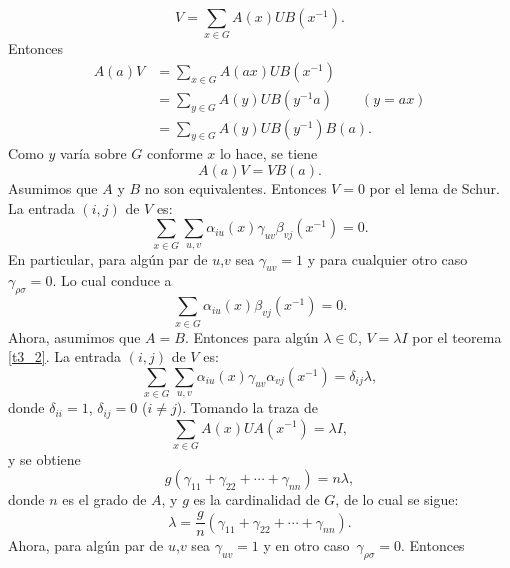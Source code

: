 \documentclass[12pt]{book}
\theoremstyle{definition}
\newcounter{in}
\begin{document}
\begin{equation}
  \label{eq:22}
  V=\sum_{x \in G} A(x)UB(x^{-1}).  
\end{equation}
Entonces
\begin{equation}
  \label{eq:23}
  \begin{aligned}
    A(a)V &=\sum_{x \in G} A(ax)UB(x^{-1})\\
    &=\sum_{y \in G} A(y)UB(y^{-1}a) \qquad (y=ax)\\
    &=\sum_{y \in G} A(y)UB(y^{-1})B(a).
  \end{aligned}
\end{equation}
Como $y$ varía sobre $G$ conforme $x$ lo hace, se tiene
\begin{equation}
  \label{eq:24}
  A(a)V=VB(a).
\end{equation} 
Asumimos que $A$ y $B$ no son equivalentes. Entonces $V=0$ por el lema
de Schur. La entrada $(i,j)$ de $V$ es:
\begin{equation}
  \label{eq:25}
  \sum_{x \in G} \sum_{u,v} \alpha_{iu}(x) \gamma_{uv} \beta_{vj}(x^{-1}) = 0.
\end{equation}
En particular, para algún par de $u$,$v$ sea $\gamma_{uv}=1$ y para
cualquier otro caso~$\gamma_{\rho \sigma}=0$. Lo cual conduce a
\begin{equation}
  \label{eq:26}
  \sum_{x \in G} \alpha_{iu}(x) \beta_{vj}(x^{-1}) = 0.
\end{equation}
Ahora, asumimos que $A=B$. Entonces para algún
$\lambda \in \mathbb{C}$, $V=\lambda I$ por el teorema \ref{t3_2}. La
entrada $(i,j)$ de $V$ es:
\begin{equation}
  \label{eq:27}
   \sum_{x \in G} \sum_{u,v} \alpha_{iu}(x) \gamma_{uv} \alpha_{vj}(x^{-1}) = \delta_{ij}\lambda,
\end{equation}
donde $\delta_{ii}=1$, $\delta_{ij}=0$ ($i \neq j$). Tomando la traza de
\begin{equation}
  \label{eq:28}
  \sum_{x \in G} A(x)UA(x^{-1}) = \lambda I,
\end{equation}
y se obtiene
\begin{equation}
  \label{eq:29}
  g(\gamma_{11}+\gamma_{22}+ \cdots +\gamma_{nn})=n \lambda,
\end{equation}
donde $n$ es el grado de $A$, y $g$ es la cardinalidad de $G$, de lo cual se sigue:
\begin{equation}
  \label{eq:30}
  \lambda=\frac{g}{n}(\gamma_{11}+\gamma_{22}+ \cdots + \gamma_{nn}).
\end{equation}
Ahora, para algún par de $u$,$v$ sea $\gamma_{uv}=1$ y en otro caso~$\gamma_{\rho \sigma}=0$. Entonces
\end{document}
